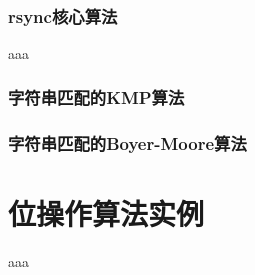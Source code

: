 ﻿\documentclass[a4paper,11pt]{article}
\begin{document}
  \tt %
  \pagestyle{header}
  \sybmaketitle
  \tableofcontents
  \newpage

\pagestyle{main}
\setcounter{page}{1}

\section[rsync核心算法]{rsync核心算法}
aaa





\section[字符串匹配的KMP算法]{字符串匹配的KMP算法}

\section[字符串匹配的Boyer-Moore算法]{字符串匹配的Boyer-Moore算法}


\part[位操作算法实例]{位操作算法实例}
aaa
\end{document}
